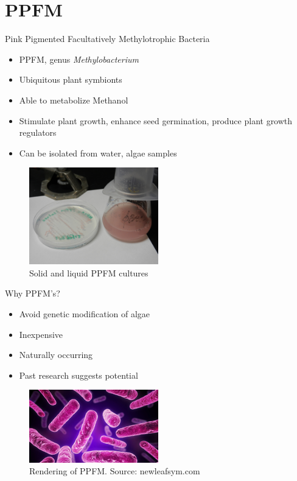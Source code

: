 \documentclass[8pt]{beamer}\usepackage[]{graphicx}\usepackage[]{color}
\begin{document}
\section{PPFM}
\begin{frame}{Pink Pigmented Facultatively Methylotrophic Bacteria}
\begin{itemize}
\item PPFM, genus {\it Methylobacterium}
\item Ubiquitous plant symbionts
\item Able to metabolize Methanol
\item Stimulate plant growth, enhance seed germination, produce plant growth regulators %
\item Can be isolated from water, algae samples
\end{itemize}

\begin{figure}
    \centering
    \includegraphics[width=0.5\textwidth]{./figure/PPFM_Cultures.JPG}
    \caption{Solid and liquid PPFM cultures}
    \label{}
\end{figure}

\end{frame}
\begin{frame}{Why PPFM's?}
\begin{itemize}
\item Avoid genetic modification of algae
\item Inexpensive
\item Naturally occurring
\item Past research suggests potential
\end{itemize}

\begin{figure}%
    \includegraphics[width=0.5\textwidth]{./figure/ppfm_newleafsym_com}
    \caption{Rendering of PPFM. Source: newleafsym.com}
\end{figure}

\end{frame}
\end{document}

